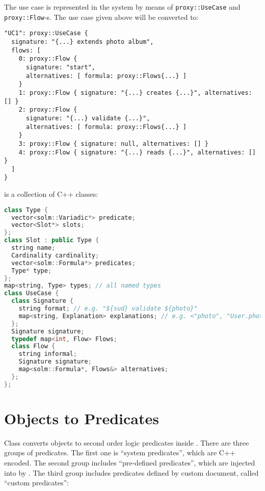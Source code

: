 \documentclass{article}
\begin{document}
        The use case is represented in the system by means of 
        \texttt{proxy::UseCase} and \texttt{proxy::Flow}-s. The
        use case given above will be converted to:

        \begin{verbatim}
"UC1": proxy::UseCase {
  signature: "{...} extends photo album",
  flows: [
    0: proxy::Flow { 
      signature: "start", 
      alternatives: [ formula: proxy::Flows{...} ] 
    }
    1: proxy::Flow { signature: "{...} creates {...}", alternatives: [] }
    2: proxy::Flow { 
      signature: "{...} validate {...}", 
      alternatives: [ formula: proxy::Flows{...} ] 
    }
    3: proxy::Flow { signature: null, alternatives: [] }
    4: proxy::Flow { signature: "{...} reads {...}", alternatives: [] }
  ]
}\end{verbatim}

         is a collection of C++ classes:
    
    \begin{lstlisting}[language=C++]
class Type {
  vector<solm::Variadic*> predicate;
  vector<Slot*> slots;
};
class Slot : public Type {
  string name;
  Cardinality cardinality;
  vector<solm::Formula*> predicates;
  Type* type;
};
map<string, Type> types; // all named types
class UseCase {
  class Signature {
    string format; // e.g. "${sud} validate ${photo}"
    map<string, Explanation> explanations; // e.g. <"photo", "User.photos">
  };
  Signature signature;
  typedef map<int, Flow> Flows;
  class Flow {
    string informal;
    Signature signature;
    map<solm::Formula*, Flows&> alternatives;
  };
};
\end{lstlisting}

\section{Objects to Predicates}\label{sec:to-solm}

    Class  converts objects to second order logic predicates
    inside . There are
    three groups of predicates. The first one is ``system predicates'', which
    are C++ encoded. The second group includes ``pre-defined predicates'',
    which are injected into  by . The third group includes
    predicates defined by custom document, called ``custom predicates'':
    
\end{document}
